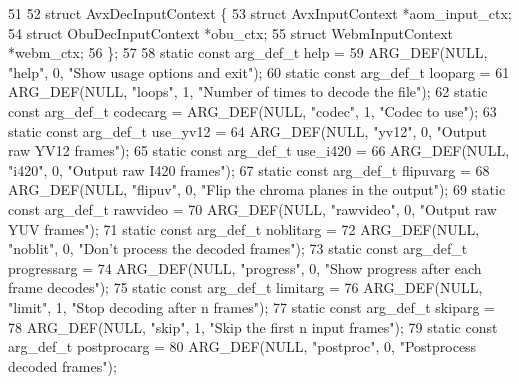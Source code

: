 \begin{DoxyCodeInclude}
51 
52 \textcolor{keyword}{struct }AvxDecInputContext \{
53   \textcolor{keyword}{struct }AvxInputContext *aom\_input\_ctx;
54   \textcolor{keyword}{struct }ObuDecInputContext *obu\_ctx;
55   \textcolor{keyword}{struct }WebmInputContext *webm\_ctx;
56 \};
57 
58 \textcolor{keyword}{static} \textcolor{keyword}{const} arg\_def\_t help =
59     ARG\_DEF(NULL, \textcolor{stringliteral}{"help"}, 0, \textcolor{stringliteral}{"Show usage options and exit"});
60 \textcolor{keyword}{static} \textcolor{keyword}{const} arg\_def\_t looparg =
61     ARG\_DEF(NULL, \textcolor{stringliteral}{"loops"}, 1, \textcolor{stringliteral}{"Number of times to decode the file"});
62 \textcolor{keyword}{static} \textcolor{keyword}{const} arg\_def\_t codecarg = ARG\_DEF(NULL, \textcolor{stringliteral}{"codec"}, 1, \textcolor{stringliteral}{"Codec to use"});
63 \textcolor{keyword}{static} \textcolor{keyword}{const} arg\_def\_t use\_yv12 =
64     ARG\_DEF(NULL, \textcolor{stringliteral}{"yv12"}, 0, \textcolor{stringliteral}{"Output raw YV12 frames"});
65 \textcolor{keyword}{static} \textcolor{keyword}{const} arg\_def\_t use\_i420 =
66     ARG\_DEF(NULL, \textcolor{stringliteral}{"i420"}, 0, \textcolor{stringliteral}{"Output raw I420 frames"});
67 \textcolor{keyword}{static} \textcolor{keyword}{const} arg\_def\_t flipuvarg =
68     ARG\_DEF(NULL, \textcolor{stringliteral}{"flipuv"}, 0, \textcolor{stringliteral}{"Flip the chroma planes in the output"});
69 \textcolor{keyword}{static} \textcolor{keyword}{const} arg\_def\_t rawvideo =
70     ARG\_DEF(NULL, \textcolor{stringliteral}{"rawvideo"}, 0, \textcolor{stringliteral}{"Output raw YUV frames"});
71 \textcolor{keyword}{static} \textcolor{keyword}{const} arg\_def\_t noblitarg =
72     ARG\_DEF(NULL, \textcolor{stringliteral}{"noblit"}, 0, \textcolor{stringliteral}{"Don't process the decoded frames"});
73 \textcolor{keyword}{static} \textcolor{keyword}{const} arg\_def\_t progressarg =
74     ARG\_DEF(NULL, \textcolor{stringliteral}{"progress"}, 0, \textcolor{stringliteral}{"Show progress after each frame decodes"});
75 \textcolor{keyword}{static} \textcolor{keyword}{const} arg\_def\_t limitarg =
76     ARG\_DEF(NULL, \textcolor{stringliteral}{"limit"}, 1, \textcolor{stringliteral}{"Stop decoding after n frames"});
77 \textcolor{keyword}{static} \textcolor{keyword}{const} arg\_def\_t skiparg =
78     ARG\_DEF(NULL, \textcolor{stringliteral}{"skip"}, 1, \textcolor{stringliteral}{"Skip the first n input frames"});
79 \textcolor{keyword}{static} \textcolor{keyword}{const} arg\_def\_t postprocarg =
80     ARG\_DEF(NULL, \textcolor{stringliteral}{"postproc"}, 0, \textcolor{stringliteral}{"Postprocess decoded frames"});

\end{DoxyCodeInclude}

